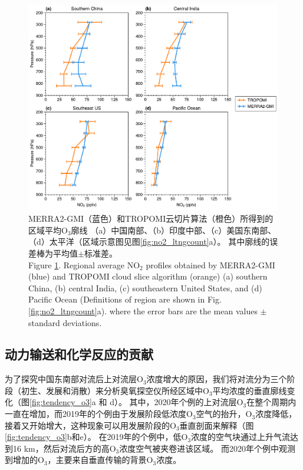 \begin{figure}[!htbp]
    \centering
    \includegraphics[width=12cm]{./figures/uto3_profile.pdf}
    \caption{
    MERRA2-GMI（蓝色）和TROPOMI云切片算法（橙色）所得到的区域平均O$_3$廓线
    （a）中国南部、（b）印度中部、（c）美国东南部、（d）太平洋（区域示意图见图\ref{fig:no2_ltngcount}a）。
    其中廓线的误差棒为平均值$\pm$标准差。\\
    Figure \ref{fig:uto3_profile}. Regional average NO$_2$ profiles obtained by MERRA2-GMI (blue) and TROPOMI cloud slice algorithm (orange)
    (a) southern China, (b) central India, (c) southeastern United States, and (d) Pacific Ocean
    (Definitions of region are shown in Fig. \ref{fig:no2_ltngcount}a).
    where the error bars are the mean values $\pm$ standard deviations.
    }
    \label{fig:uto3_profile}
\end{figure}


\subsection{动力输送和化学反应的贡献} \label{subsect:convec_impacts}

为了探究中国东南部对流后上对流层O$_3$浓度增大的原因，我们将对流分为三个阶段（初生、发展和消散）来分析臭氧探空仪所经区域中O$_3$平均浓度的垂直廓线变化（图\ref{fig:tendency_o3}a 和 d）。
其中，2020年个例的上对流层O$_3$在整个周期内一直在增加，而2019年的个例由于发展阶段低浓度O$_3$空气的抬升，O$_3$浓度降低，接着又开始增大，这种现象可以用发展阶段的O$_3$垂直剖面来解释（图\ref{fig:tendency_o3}b和e）。
在2019年的个例中，低O$_3$浓度的空气块通过上升气流达到16 km，然后对流后方的高O$_3$浓度空气被夹卷进该区域。
而2020年个例中观测到增加的O$_3$，主要来自垂直传输的背景O$_3$浓度。

